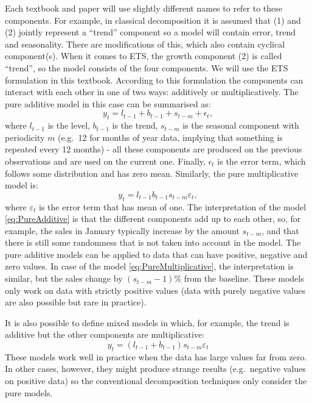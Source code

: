 \documentclass[
]{book}
\theoremstyle{definition}
\theoremstyle{definition}
\theoremstyle{definition}
\theoremstyle{definition}
\theoremstyle{remark}
\begin{document}
Each textbook and paper will use slightly different names to refer to these components. For example, in classical decomposition \citep{Persons1919} it is assumed that (1) and (2) jointly represent a ``trend'' component so a model will contain error, trend and seasonality. There are modifications of this, which also contain cyclical component(s). When it comes to ETS, the growth component (2) is called ``trend'', so the model consists of the four components. We will use the ETS formulation in this textbook. According to this formulation the components can interact with each other in one of two ways: additively or multiplicatively. The pure additive model in this case can be summarised as:
\begin{equation}
    y_t = l_{t-1} + b_{t-1} + s_{t-m} + \epsilon_t ,
    \label{eq:PureAdditive}
\end{equation}
where \(l_{t-1}\) is the level, \(b_{t-1}\) is the trend, \(s_{t-m}\) is the seasonal component with periodicity \(m\) (e.g.~12 for months of year data, implying that something is repeated every 12 months) - all these components are produced on the previous observations and are used on the current one. Finally, \(\epsilon_t\) is the error term, which follows some distribution and has zero mean. Similarly, the pure multiplicative model is:
\begin{equation}
    y_t = l_{t-1} b_{t-1} s_{t-m} \varepsilon_t ,
    \label{eq:PureMultiplicative}
\end{equation}
where \(\varepsilon_t\) is the error term that has mean of one. The interpretation of the model \eqref{eq:PureAdditive} is that the different components add up to each other, so, for example, the sales in January typically increase by the amount \(s_{t-m}\), and that there is still some randomness that is not taken into account in the model. The pure additive models can be applied to data that can have positive, negative and zero values. In case of the model \eqref{eq:PureMultiplicative}, the interpretation is similar, but the sales change by \((s_{t-m}-1)\)\% from the baseline. These models only work on data with strictly positive values (data with purely negative values are also possible but rare in practice).

It is also possible to define mixed models in which, for example, the trend is additive but the other components are multiplicative:
\begin{equation}
    y_t = (l_{t-1} + b_{t-1}) s_{t-m} \varepsilon_t
    \label{eq:MixedAdditiveTrend}
\end{equation}
These models work well in practice when the data has large values far from zero. In other cases, however, they might produce strange results (e.g.~negative values on positive data) so the conventional decomposition techniques only consider the pure models.
\end{document}

